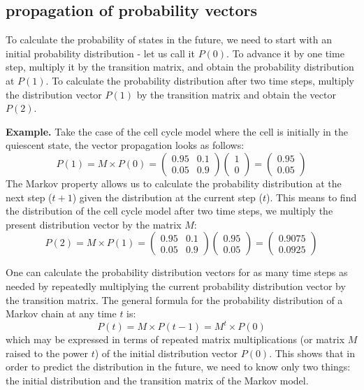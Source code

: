 \documentclass[
]{book}
\theoremstyle{definition}
\theoremstyle{definition}
\theoremstyle{definition}
\theoremstyle{remark}
\begin{document}
\hypertarget{propagation-of-probability-vectors}{%
\subsection{propagation of probability vectors}\label{propagation-of-probability-vectors}}

To calculate the probability of states in the future, we need to start with an initial probability distribution - let us call it \(P(0)\). To advance it by one time step, multiply it by the transition matrix, and obtain the probability distribution at \(P(1)\). To calculate the probability distribution after two time steps, multiply the distribution vector \(P(1)\) by the transition matrix and obtain the vector \(P(2)\).

\textbf{Example.} Take the case of the cell cycle model where the cell is initially in the quiescent state, the vector propagation looks as follows:
\[ P(1) = M \times  P(0) = \left(\begin{array}{cc}0.95 & 0.1 \\0.05 & 0.9\end{array}\right)  \left(\begin{array}{c}1  \\ 0\end{array}\right) = \left(\begin{array}{c} 0.95 \\ 0.05\end{array}\right) \]
The Markov property allows us to calculate the probability distribution at the next step (\(t+1\)) given the distribution at the current step (\(t\)). This means to find the distribution of the cell cycle model after two time steps, we multiply the present distribution vector by the matrix \(M\):
\[ P(2) = M   \times  P(1) =  \left(\begin{array}{cc}0.95 & 0.1 \\0.05 & 0.9\end{array}\right)\left(\begin{array}{c} 0.95 \\ 0.05\end{array}\right) = \left(\begin{array}{c} 0.9075 \\ 0.0925\end{array}\right) \]

One can calculate the probability distribution vectors for as many time steps as needed by repeatedly multiplying the current probability distribution vector by the transition matrix. The general formula for the probability distribution of a Markov chain at any time \(t\) is:
\[
P(t) = M \times P(t-1) = M^{t}  \times  P(0)
\label{eq:Markov_chain}
\]
which may be expressed in terms of repeated matrix multiplications (or matrix \(M\) raised to the power \(t\)) of the initial distribution vector \(P(0)\). This shows that in order to predict the distribution in the future, we need to know only two things: the initial distribution and the transition matrix of the Markov model.
\end{document}
